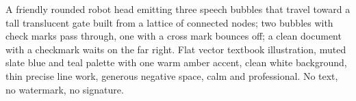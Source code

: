 A friendly rounded robot head emitting three speech bubbles that travel toward a tall translucent gate built from a lattice of connected nodes; two bubbles with check marks pass through, one with a cross mark bounces off; a clean document with a checkmark waits on the far right. Flat vector textbook illustration, muted slate blue and teal palette with one warm amber accent, clean white background, thin precise line work, generous negative space, calm and professional. No text, no watermark, no signature.
